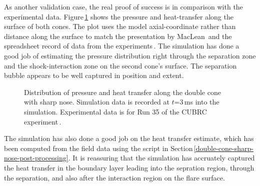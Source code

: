 \medskip
As another validation case, the real proof of success is in comparison with the experimental data.
Figure\,\ref{fig:double-cone-sharp-nose-plate-data-compare} shows the pressure and heat-transfer
along the surface of both cones.
The plot uses the model axial-coordinate rather than distance along the surface
to match the presentation by MacLean\,\cite{maclean_holden_2004a} and 
the spreadsheet record of data from
the experiments\,\cite{holden_etal_2002a,holden_wadhams_2003a}.
The simulation has done a good job of estimating the pressure distribution right 
through the separation zone and the shock-interaction zone on the second cone's surface.
The separation bubble appears to be well captured in position and extent.

\begin{figure}[htb]
 \centering
 \caption{Distribution of pressure and heat transfer along the double cone with sharp nose.
   Simulation data is recorded at $t$=3\,ms into the simulation.
   Experimental data is for Run 35 of the CUBRC experiment\,\cite{holden_etal_2002a}.}
 \label{fig:double-cone-sharp-nose-plate-data-compare}
\end{figure}

\medskip
The simulation has also done a good job on the heat transfer estimate,
which has been computed from the field data using the script in Section\,\ref{double-cone-sharp-nose-post-processing}.
It is reassuring that the simulation has accruately captured the heat transfer
in the boundary layer leading into the sepration region,
through the separation, and also after the interaction region on the flare surface.

